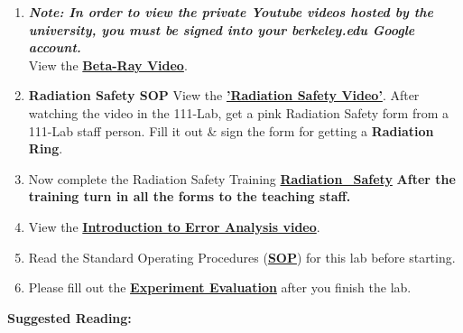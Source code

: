 \documentclass{../lab}
\begin{document}
\begin{enumerate}
    \item \emph{\textbf{Note: In order to view the private Youtube videos hosted by the university, you must be signed into your berkeley.edu Google account.}} \\
    View the \href{http://youtu.be/qJ4MPtMmFPw}{\textbf{Beta-Ray Video}}.

    \item \textbf{Radiation Safety SOP} View the \href{http://youtu.be/KHxtzF5pZZM}{\textbf{'Radiation Safety Video'}}. After watching the video in the 111-Lab, get a pink Radiation Safety form from a 111-Lab staff person. Fill it out \& sign the form for getting a \textbf{Radiation Ring}.

    \item Now complete the Radiation Safety Training \href{https://berkeley-physics111b.github.io/safety/radiation/}{\textbf{Radiation\_Safety}} \textbf{After the training turn in all the forms to the teaching staff.}

    \item View the \href{\ErrorAnalysisVideo}{\textbf{Introduction to Error Analysis video}}.

    \item Read the Standard Operating Procedures (\href{https://berkeley-physics111b.github.io/assets/pdf/oldwebsitestructure/images/SOP\_3271\_Cs-137\_Na-22\_Co-60\_Mn-54\_Am-241\_Fe-55\_2014.pdf}{\textbf{SOP}}) for this lab before starting.

    \item Please fill out the \href{\ExperimentEvaluation}{\textbf{Experiment Evaluation}} after you finish the lab.

\end{enumerate}

\textbf{Suggested Reading:}
\end{document}
